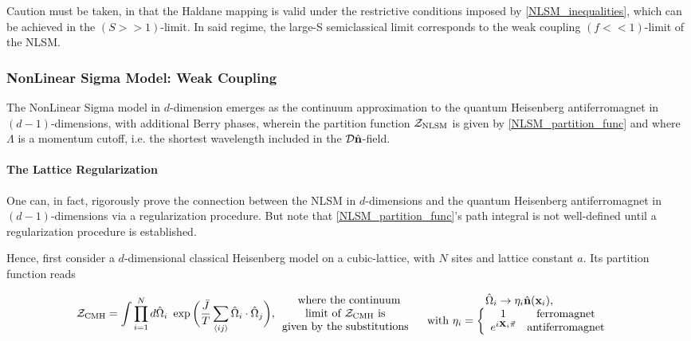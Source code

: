 Caution must be taken, in that the Haldane mapping is valid under the restrictive conditions imposed by \cref{NLSM_inequalities}, which can be achieved in the $(S>>1)$-limit. In said regime, the large-S semiclassical limit corresponds to the weak coupling $(f<<1)$-limit of the NLSM. \\

\subsubsection{NonLinear Sigma Model: Weak Coupling}

The NonLinear Sigma model in $d$-dimension emerges as the continuum approximation to the quantum Heisenberg antiferromagnet in $(d-1)$-dimensions, with additional Berry phases, wherein the partition function $\mathcal{Z}_{\textnormal{NLSM}}$ is given by \cref{NLSM_partition_func} and where $\Lambda$ is a momentum cutoff, i.e. the shortest wavelength included in the $\mathcal{D}\hat{{\bf n}}$-field. \\

\paragraph{The Lattice Regularization}

One can, in fact, rigorously prove the connection between the NLSM in $d$-dimensions and the quantum Heisenberg antiferromagnet in $(d-1)$-dimensions via a regularization procedure. But note that \cref{NLSM_partition_func}'s path integral is not well-defined until a regularization procedure is established. 

Hence, first consider a $d$-dimensional classical Heisenberg model on a cubic-lattice, with $N$ sites and lattice constant $a$. Its partition function reads 

\begin{equation}
    \mathcal{Z}_{\textnormal{CMH}} = \int \prod_{i=1}^{N} d\hat{\Omega}_i \textnormal{ } \exp \bigg(\frac{\bar{J}}{T} \sum_{\langle ij \rangle} \hat{\Omega}_i \cdot \hat{\Omega}_j\bigg), \begin{array}{c}
         \textnormal{ where the continuum} \\
         \textnormal{limit of $\mathcal{Z}_{\textnormal{CMH}}$ is } \\
         \textnormal{given by the substitutions } 
    \end{array} \begin{array}{cc}
         \hat{\Omega}_i  \rightarrow \eta_i \hat{{\bf n}}({\bf x}_i), \\
         \textnormal{ with } \eta_i = \left\{\begin{array}{cc}
              1 & \textnormal{ferromagnet } \\
              e^{i {\bf X}_i \vec{\pi}} & \textnormal{antiferromagnet }
         \end{array}  \right.
    \end{array}
    \label{NLSM_Weak_partition_function_CMH}
\end{equation}

